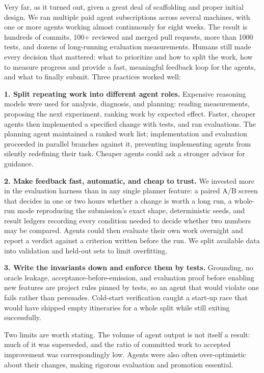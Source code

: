 \documentclass{article}
\begin{document}
Very far, as it turned out, given a great deal of scaffolding and proper initial design. We ran multiple
paid agent subscriptions across several machines, with one or more agents working
almost continuously for eight weeks. The result is hundreds of commits, 100+ reviewed and merged
pull requests, more than 1000 tests, and dozens of long-running evaluation
measurements. Humans still made every
decision that mattered: what to prioritize and
how to split the work, how to measure progress and
provide a fast, meaningful feedback loop for the
agents, and what to finally submit.
Three practices worked well:

\textbf{1. Split repeating work into different agent roles.} Expensive reasoning
models were used for analysis, diagnosis, and planning: reading measurements,
proposing the next experiment, ranking work by expected effect. Faster, cheaper
agents then implemented a specified change with tests, and ran evaluations. The
planning agent maintained a ranked work list; implementation and evaluation
proceeded in parallel branches against it, preventing implementing agents from
silently redefining their task. Cheaper agents could ask a stronger advisor for
guidance.

\textbf{2. Make feedback fast, automatic, and cheap to trust.} We invested more in
the evaluation harness than in any single planner feature: a paired A/B screen
that decides in one or two hours whether a change is worth a long run, a whole-run
mode reproducing the submission's exact shape, deterministic seeds, and result
ledgers recording every condition needed to decide whether two numbers may be
compared. Agents could then evaluate their own work overnight and report a verdict
against a criterion written before the run. We split available data into
validation and held-out sets to limit overfitting.

\textbf{3. Write the invariants down and enforce them by tests.} Grounding,
no oracle leakage, acceptance-before-emission, and evaluation proof before enabling new features are
project rules pinned by tests, so an agent that would violate one fails rather than
persuades. Cold-start verification caught a start-up race that would have shipped
empty itineraries for a whole split while still exiting successfully.

Two limits are worth stating. The volume of agent output is not itself a result:
much of it was superseded, and the ratio of committed work to accepted improvement
was correspondingly low. Agents were also often over-optimistic about their changes,
making rigorous evaluation and promotion essential.
\end{document}
